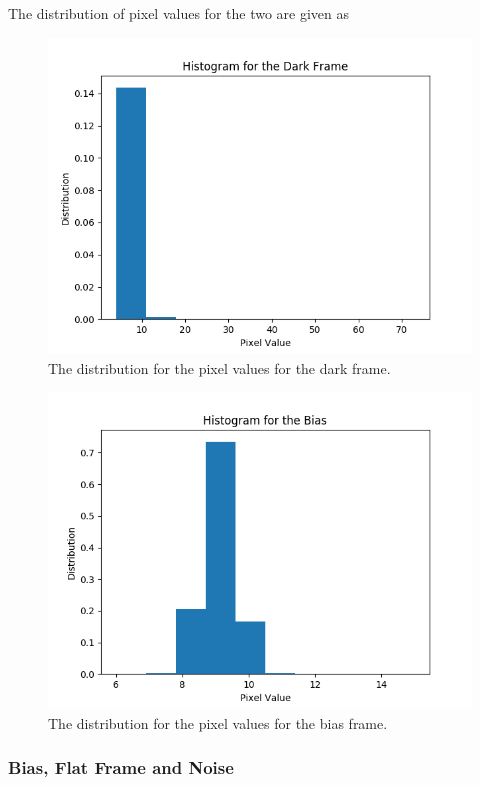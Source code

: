 \documentclass{emulateapj}
\begin{document}
The distribution of pixel values for the two are given as

\begin{figure}[H]
\centering
\includegraphics[scale=0.4]{histDark.png}
\caption{The distribution for the pixel values for the dark frame.}
\label{img:darkHist}
\end{figure}


\begin{figure}[H]
\centering
\includegraphics[scale=0.4]{histBias.png}
\caption{The distribution for the pixel values for the bias frame.}
\label{img:biasHist}
\end{figure}

\subsubsection{Bias, Flat Frame and Noise}
\label{sec:biasFlat}
\end{document}
